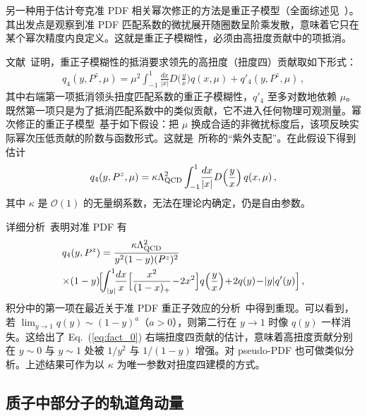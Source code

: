 另一种用于估计夸克准 PDF 相关幂次修正的方法是重正子模型（全面综述见~\cite{Beneke:1998ui}）。
%
其出发点是观察到准 PDF 匹配系数的微扰展开随圈数呈阶乘发散，意味着它只在某个幂次精度内良定义。这就是重正子模糊性，必须由高扭度贡献中的项抵消。


文献~\cite{Braun:2018brg}证明，重正子模糊性的抵消要求领先的高扭度（扭度四）贡献取如下形式：
\begin{align}
	\label{eq:Q4-cutoff}
	{q}_4(y,P^z,\mu) = \mu^2 \int_{-1}^1 \!\frac{dx}{|x|} D\Big(\frac{y}{x}\Big) q(x,\mu) + q'_4(y,P^z,\mu)\,,
\end{align}
其中右端第一项抵消领头扭度匹配系数的重正子模糊性，$q'_4$ 至多对数地依赖 $\mu$。既然第一项只是为了抵消匹配系数中的类似贡献，它不进入任何物理可观测量。幂次修正的重正子模型~\cite{Beneke:1995pq,Dokshitzer:1995qm,Dasgupta:1996hh,Dasgupta:1996ki,Beneke:1997sr,Braun:2004bu}基于如下假设：把 $\mu$ 换成合适的非微扰标度后，该项反映实际幂次压低贡献的阶数与函数形式。这就是~\cite{Braun:1995tp,Beneke:1998ui,Beneke:2000kc}所称的``紫外支配''。在此假设下得到估计
\begin{equation}
	{q}_4(y,P^z,\mu) = \kappa
	\Lambda_{\rm QCD}^2 \int_{-1}^1 \!\frac{dx}{|x|} D\Big(\frac{y}{x}\Big)\, q(x,\mu)\,,
	\label{UV_Lambda_int}
\end{equation}
其中 $\kappa$ 是 $\mathcal O(1)$ 的无量纲系数，无法在理论内确定，仍是自由参数。


详细分析~\cite{Braun:2018brg}表明对准 PDF 有
\begin{align}
	\label{t4-Qparallel}
	& {q}_4(y,P^z) =\frac{\kappa  \Lambda_{\rm QCD}^2}{y^2(1-y) (P^z)^2}\\
	&\hspace{-.2em}\times \hspace{-.2em}(1-y)\!\Big[\!\!
	\int_{|y|}^1 \!\!\frac{dx}{x} \Big[\frac{x^2}{(1-x)_+}\!-\!2x^2\Big]q\Big(\frac{y}{x}\Big)\!
	+\! 2q(y)\! -\! |y|q'(y) \Big]\,,\nn
\end{align}
积分中的第一项在最近关于准 PDF 重正子效应的分析~\cite{Liu:2020rqi}中得到重现。可以看到，若 $\lim_{y\to1}q(y)\sim (1-y)^a$（$a>0$），则第二行在 $y\to1$ 时像 $q(y)$ 一样消失。这给出了 Eq.~(\ref{eq:fact_0}) 右端扭度四贡献的估计，意味着高扭度贡献分别在 $y\sim 0$ 与 $y\sim 1$ 处被 $1/y^2$ 与 $1/(1-y)$ 增强。对 pseudo-PDF 也可做类似分析。上述结果可作为以 $\kappa$ 为唯一参数对扭度四建模的方式。

\subsection{质子中部分子的轨道角动量}
\label{sec:spin}

